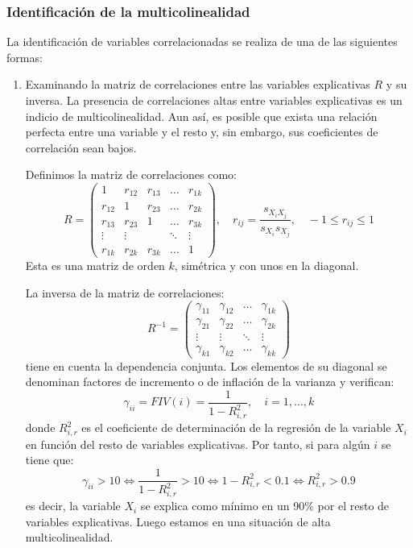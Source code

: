 \subsubsection*{Identificación de la multicolinealidad}
La identificación de variables correlacionadas se realiza de una de las siguientes formas:
\begin{enumerate}
    \item Examinando la matriz de correlaciones entre las variables explicativas $R$ y su inversa.
          La presencia de correlaciones altas entre variables explicativas es un indicio de multicolinealidad.
          Aun así, es posible que exista una relación perfecta entre una variable y el resto y, sin embargo, sus coeficientes de correlación sean bajos.

          Definimos la matriz de correlaciones como:
          $$R = \begin{pmatrix}
                  1      & r_{12} & r_{13} & \dots  & r_{1k} \\
                  r_{12} & 1      & r_{23} & \dots  & r_{2k} \\
                  r_{13} & r_{23} & 1      & \dots  & r_{3k} \\
                  \vdots & \vdots &        & \ddots & \vdots \\
                  r_{1k} & r_{2k} & r_{3k} & \dots  & 1
              \end{pmatrix}, \quad r_{ij} = \frac{s_{X_iX_j}}{s_{X_i}s_{X_j}}, \quad -1 \leq r_{ij} \leq 1$$
          Esta es una matriz de orden $k$, simétrica y con unos en la diagonal.

          La inversa de la matriz de correlaciones:
          $$R^{-1} = \begin{pmatrix}
                  \gamma_{11} & \gamma_{12} & \dots  & \gamma_{1k} \\
                  \gamma_{21} & \gamma_{22} & \dots  & \gamma_{2k} \\
                  \vdots      & \vdots      & \ddots & \vdots      \\
                  \gamma_{k1} & \gamma_{k2} & \dots  & \gamma_{kk}
              \end{pmatrix}$$
          tiene en cuenta la dependencia conjunta.
          Los elementos de su diagonal se denominan factores de incremento o de inflación de la varianza y verifican:
          $$\gamma_{ii} = FIV(i) = \frac{1}{1-R^2_{i,r}}, \quad i = 1, \dots, k$$
          donde $R^2_{i,r}$ es el coeficiente de determinación de la regresión de la variable $X_i$ en función del resto de variables explicativas.
          Por tanto, si para algún $i$ se tiene que:
          $$\gamma_{ii} > 10 \Leftrightarrow \frac{1}{1-R^2_{i,r}} > 10 \Leftrightarrow 1 - R^2_{i,r} < 0.1 \Leftrightarrow R^2_{i,r} > 0.9$$
          es decir, la variable $X_i$ se explica como mínimo en un 90\% por el resto de variables explicativas.
          Luego estamos en una situación de alta multicolinealidad.


\end{enumerate}
